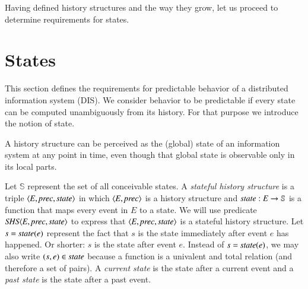 \documentclass{elsarticle}
\def\id#1{\text{\em #1\/}}
\def\Events{{\mathit E}}
\begin{document}
	Having defined history structures and the way they grow, let us proceed to determine requirements for states.

\section{States}
	This section defines the requirements for predictable behavior of a distributed information system (DIS).
	We consider behavior to be predictable if every state can be computed unambiguously from its history.
	For that purpose we introduce the notion of state.

	A history structure can be perceived as the (global) state of an information system at any point in time,
	even though that global state is observable only in its local parts.

	Let $\mathbb S$ represent the set of all conceivable states.
	A {\em stateful history structure} is a triple $\la\Events, \id{prec}, \id{state}\ra$ in which
	$\la \Events, \id{prec}\ra$ is a history structure and $\id{state}:\Events\rightarrow{\mathbb S}$ is a function
	that maps every event in $\Events$ to a state.
	We will use predicate $\id{SHS}\la \Events, \id{prec}, \id{state}\ra$
	to express that $\la \Events, \id{prec}, \id{state}\ra$ is a stateful history structure.
	Let $s=\id{state}(e)$ represent the fact that $s$ is the state immediately after event $e$ has happened.
	Or shorter: $s$ is the state after event $e$.
	Instead of $s=\id{state}(e)$, we may also write $(s,e)\in\id{state}$ because a function is a univalent and total relation
	(and therefore a set of pairs).
	A {\em current state} is the state after a current event
	and a {\em past state} is the state after a past event.
\end{document}
